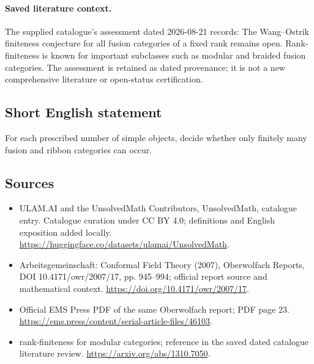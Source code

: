 \documentclass[11pt]{article}
\begin{document}
\paragraph{Saved literature context.} The supplied catalogue's assessment dated 2026-08-21 records: The Wang--Ostrik finiteness conjecture for all fusion categories of a fixed rank remains open. Rank-finiteness is known for important subclasses such as modular and braided fusion categories. The assessment is retained as dated provenance; it is not a new comprehensive literature or open-status certification.
\subsection{Short English statement}
For each prescribed number of simple objects, decide whether only finitely many fusion and ribbon categories can occur.
\subsection{Sources}
\begin{itemize}
\item[\hypertarget{source:statement:1}{S1}] ULAM.AI and the UnsolvedMath Contributors, UnsolvedMath, catalogue entry. Catalogue curation under CC BY 4.0; definitions and English exposition added locally.
\url{https://huggingface.co/datasets/ulamai/UnsolvedMath}.
\item[\hypertarget{source:statement:2}{S2}] Arbeitsgemeinschaft: Conformal Field Theory (2007), Oberwolfach Reports, DOI 10.4171/owr/2007/17, pp. 945--994; official report source and mathematical context.
\url{https://doi.org/10.4171/owr/2007/17}.
\item[\hypertarget{source:statement:3}{S3}] Official EMS Press PDF of the same Oberwolfach report; PDF page 23.
\url{https://ems.press/content/serial-article-files/46103}.
\item[\hypertarget{source:statement:4}{S4}] rank-finiteness for modular categories; reference in the saved dated catalogue literature review.
\url{https://arxiv.org/abs/1310.7050}.
\end{itemize}
\label{end:statement}
\end{document}
